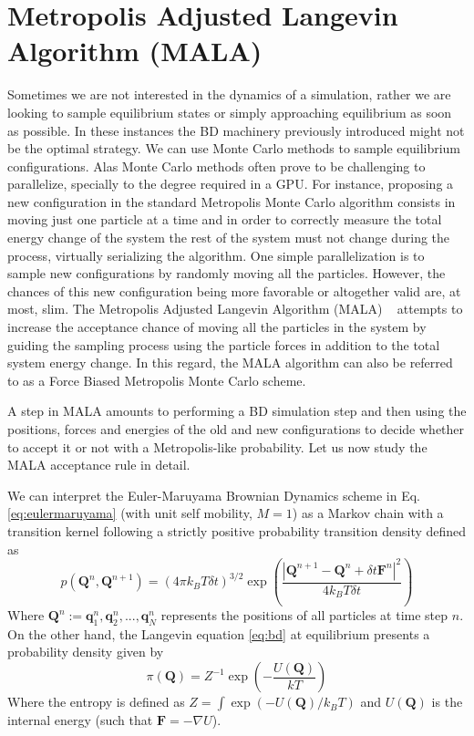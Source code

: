 \documentclass[ twoside,openright,titlepage,numbers=noenddot,%
headinclude,footinclude,cleardoublepage=empty,abstract=on,
BCOR=5mm,paper=b5,fontsize=11pt, dvipsnames
]{scrreprt}
\renewcommand{\vec}[1]{\bm{#1}}
\newcommand{\gpu}{\gls{GPU}\xspace}
\newcommand{\dt}{\delta t}
\newcommand{\kT}{k_B T}
\newcommand{\ppos}{q}
\begin{document}
\section{Metropolis Adjusted Langevin Algorithm (MALA)}
Sometimes we are not interested in the dynamics of a simulation, rather we are looking to sample equilibrium states or simply approaching equilibrium as soon as possible. In these instances the \gls{BD} machinery previously introduced might not be the optimal strategy. We can use Monte Carlo methods to sample equilibrium configurations. Alas Monte Carlo methods often prove to be challenging to parallelize, specially to the degree required in a \gpu. For instance, proposing a new configuration in the standard Metropolis Monte Carlo algorithm consists in moving just one particle at a time and in order to correctly measure the total energy change of the system the rest of the system must not change during the process, virtually serializing the algorithm. One simple parallelization is to sample new configurations by randomly moving all the particles. However, the chances of this new configuration being more favorable or altogether valid are, at most, slim.
The Metropolis Adjusted Langevin Algorithm (MALA) ~\cite{Bou2010} attempts to increase the acceptance chance of moving all the particles in the system by guiding the sampling process using the particle forces in addition to the total system energy change. In this regard, the MALA algorithm can also be referred to as a Force Biased Metropolis Monte Carlo scheme.

 A step in MALA amounts to performing a \gls{BD} simulation step and then using the positions, forces and energies of the old and new configurations to decide whether to accept it or not with a Metropolis-like probability. Let us now study the MALA acceptance rule in detail.

We can interpret the Euler-Maruyama Brownian Dynamics scheme in Eq. \eqref{eq:eulermaruyama} (with unit self mobility, $M=1$) as a Markov chain with a transition kernel following a strictly positive probability transition density defined as
\begin{equation}
  \label{eq:malakernel}
  p( \vec{Q}^n, \vec{Q}^{n+1}) = (4\pi \kT\dt)^{3/2}\exp\left(\frac{\left|\vec{Q}^{n+1} - \vec{Q}^n + \dt\vec{F}^n\right|^2}{4\kT\dt}\right)
\end{equation}
Where $\vec{Q}^n:={\vec{\ppos}_1^n, \vec{\ppos}^n_2, ..., \vec{\ppos}^n_N}$ represents the positions of all particles at time step $n$.
On the other hand, the Langevin equation \eqref{eq:bd} at equilibrium presents a probability density given by
\begin{equation}
  \label{eq:malatarget}
  \pi(\vec{Q}) = Z^{-1}\exp\left(-\frac{U(\vec{Q})}{kT}\right)
\end{equation}
Where the entropy is defined as $Z = \int\exp\left(-U(\vec{Q})/\kT\right)$ and $U(\vec{Q})$ is the internal energy (such that $\vec{F} = -\nabla U$).
\end{document}
